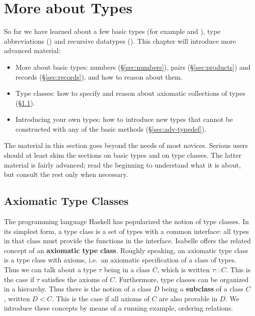 \chapter{More about Types}
\label{ch:more-types}

So far we have learned about a few basic types (for example  and
), type abbreviations () and recursive datatypes
(). This chapter will introduce more
advanced material:
\begin{itemize}
\item More about basic types: numbers ({\S}\ref{sec:numbers}), pairs
  ({\S}\ref{sec:products}) and records ({\S}\ref{sec:records}), and how to
  reason about them.
\item Type classes: how to specify and reason about axiomatic collections of
  types ({\S}\ref{sec:axclass}).
\item Introducing your own types: how to introduce new types that
  cannot be constructed with any of the basic methods
  ({\S}\ref{sec:adv-typedef}).
\end{itemize}

The material in this section goes beyond the needs of most novices.  Serious
users should at least skim the sections on basic types and on type classes.
The latter material is fairly advanced; read the beginning to understand what
it is 
about, but consult the rest only when necessary.








\section{Axiomatic Type Classes}
\label{sec:axclass}


The programming language Haskell has popularized the notion of type classes.
In its simplest form, a type class is a set of types with a common interface:
all types in that class must provide the functions in the interface.
Isabelle offers the related concept of an \textbf{axiomatic type class}.
Roughly speaking, an axiomatic type class is a type class with axioms, i.e.\ 
an axiomatic specification of a class of types. Thus we can talk about a type
$\tau$ being in a class $C$, which is written $\tau :: C$.  This is the case if
$\tau$ satisfies the axioms of $C$. Furthermore, type classes can be
organized in a hierarchy.  Thus there is the notion of a class $D$ being a
\textbf{subclass}\index{subclasses}
of a class $C$, written $D < C$. This is the case if all
axioms of $C$ are also provable in $D$. We introduce these concepts
by means of a running example, ordering relations.

